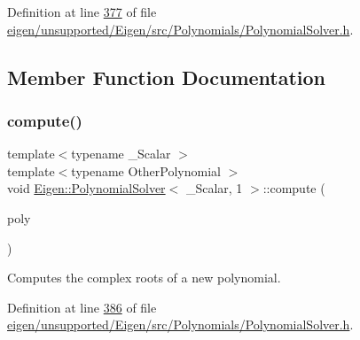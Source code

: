 Definition at line \hyperlink{eigen_2unsupported_2_eigen_2src_2_polynomials_2_polynomial_solver_8h_source_l00377}{377} of file \hyperlink{eigen_2unsupported_2_eigen_2src_2_polynomials_2_polynomial_solver_8h_source}{eigen/unsupported/\+Eigen/src/\+Polynomials/\+Polynomial\+Solver.\+h}.



\subsection{Member Function Documentation}
\mbox{\label{class_eigen_1_1_polynomial_solver_3_01___scalar_00_011_01_4_ac10c32870abba4461d681506eaa63e18}} 
\subsubsection{\texorpdfstring{compute()}{compute()}\hspace{0.1cm}{\footnotesize\ttfamily [1/2]}}
{\footnotesize\ttfamily template$<$typename \+\_\+\+Scalar $>$ \\
template$<$typename Other\+Polynomial $>$ \\
void \hyperlink{class_eigen_1_1_polynomial_solver}{Eigen\+::\+Polynomial\+Solver}$<$ \+\_\+\+Scalar, 1 $>$\+::compute (\begin{DoxyParamCaption}\item[{const Other\+Polynomial \&}]{poly }\end{DoxyParamCaption})\hspace{0.3cm}{\ttfamily [inline]}}

Computes the complex roots of a new polynomial. 

Definition at line \hyperlink{eigen_2unsupported_2_eigen_2src_2_polynomials_2_polynomial_solver_8h_source_l00386}{386} of file \hyperlink{eigen_2unsupported_2_eigen_2src_2_polynomials_2_polynomial_solver_8h_source}{eigen/unsupported/\+Eigen/src/\+Polynomials/\+Polynomial\+Solver.\+h}.

\mbox{\label{class_eigen_1_1_polynomial_solver_3_01___scalar_00_011_01_4_ac10c32870abba4461d681506eaa63e18}} 
